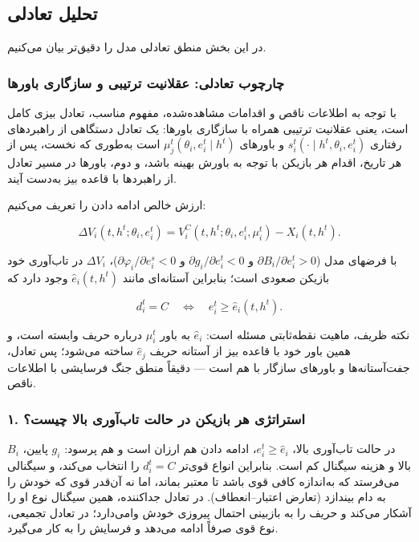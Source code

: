 \documentclass[12pt]{article}
\begin{document}
\subsection{تحلیل تعادلی}

در این بخش منطق تعادلی مدل را دقیق‌تر بیان می‌کنیم.

\subsubsection*{چارچوب تعادلی: عقلانیت ترتیبی و سازگاری باورها}

با توجه به اطلاعات ناقص و اقدامات مشاهده‌شده، مفهوم مناسب،
تعادل بیزی کامل است، یعنی عقلانیت ترتیبی همراه با سازگاری باورها:
یک تعادل دستگاهی از راهبردهای رفتاری $s_i^t(\cdot \mid h^t,\theta_i,e_i^t)$
و باورهای $\mu_j^t(\theta_i,e_i^t \mid h^t)$ است به‌طوری که
نخست، پس از هر تاریخ، اقدام هر بازیکن با توجه به باورش بهینه باشد،
و دوم، باورها در مسیر تعادل از راهبردها با قاعده بیز به‌دست آیند.

ارزش خالص ادامه دادن را تعریف می‌کنیم:

\begin{equation*}
    \Delta V_i(t,h^t;\theta_i,e_i^t) =
    V_i^C(t,h^t;\theta_i,e_i^t,\mu_i^t) - X_i(t,h^t).
\end{equation*}

با فرضهای مدل ($\partial B_i/\partial e_i^t > 0$ و $\partial g_i/\partial e_i^t < 0$
و $\partial \varphi_i/\partial e_i^s < 0$)، $\Delta V_i$ در تاب‌آوری خود بازیکن صعودی است؛
بنابراین آستانه‌ای مانند $\hat e_i(t,h^t)$ وجود دارد که

\begin{equation*}
    d_i^t = C \quad\Longleftrightarrow\quad e_i^t \ge \hat e_i(t,h^t).
\end{equation*}

نکته ظریف، ماهیت نقطه‌ثابتی مسئله است: $\hat e_i$ به باور $\mu_i^t$ درباره حریف وابسته است،
و همین باور خود با قاعده بیز از آستانه حریف $\hat e_j$ ساخته می‌شود؛
پس تعادل، جفت‌آستانه‌ها و باورهای سازگار با هم است —
دقیقاً منطق جنگ فرسایشی با اطلاعات ناقص.

\subsubsection*{۱. استراتژی هر بازیکن در حالت تاب‌آوری بالا چیست؟}

در حالت تاب‌آوری بالا، $e_i^t \ge \hat e_i$، ادامه دادن هم ارزان است و هم پرسود:
$g_i$ پایین، $B_i$ بالا و هزینه سیگنال کم است.
بنابراین انواع قوی‌تر $d_i^t = C$ را انتخاب می‌کند، 
و سیگنالی می‌فرستد که به‌اندازه کافی قوی باشد تا معتبر بماند،
اما نه آن‌قدر قوی که خودش را به دام بیندازد (تعارض اعتبار–انعطاف).
در تعادل جداکننده، همین سیگنال نوع او را آشکار می‌کند
و حریف را به بازبینی احتمال پیروزی خودش وامی‌دارد؛
در تعادل تجمیعی، نوع قوی صرفاً ادامه می‌دهد و فرسایش را به کار می‌گیرد.
\end{document}
